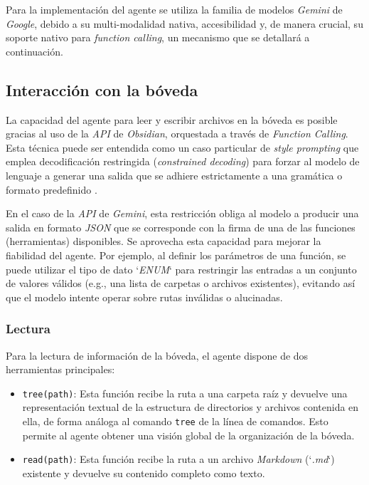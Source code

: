 Para la implementación del agente se utiliza la familia de modelos \textit{Gemini} de \textit{Google}, debido a su multi-modalidad nativa, accesibilidad y, de manera crucial, su soporte nativo para \textit{function calling}, un mecanismo que se detallará a continuación.

\subsection{Interacción con la bóveda}
La capacidad del agente para leer y escribir archivos en la bóveda es posible gracias al uso de la \textit{API} de \textit{Obsidian}, orquestada a través de \textit{Function Calling}. Esta técnica puede ser entendida como un caso particular de \textit{style prompting} que emplea decodificación restringida (\textit{constrained decoding}) para forzar al modelo de lenguaje a generar una salida que se adhiere estrictamente a una gramática o formato predefinido \parencite{gengGrammarConstrainedDecodingStructured2024}.

\newpage

En el caso de la \textit{API} de \textit{Gemini}, esta restricción obliga al modelo a producir una salida en formato \textit{JSON} que se corresponde con la firma de una de las funciones (herramientas) disponibles. Se aprovecha esta capacidad para mejorar la fiabilidad del agente. Por ejemplo, al definir los parámetros de una función, se puede utilizar el tipo de dato `\textit{ENUM}` para restringir las entradas a un conjunto de valores válidos (e.g., una lista de carpetas o archivos existentes), evitando así que el modelo intente operar sobre rutas inválidas o alucinadas.

\subsubsection{Lectura}
Para la lectura de información de la bóveda, el agente dispone de dos herramientas principales:
\begin{itemize}
    \item \texttt{tree(path)}: Esta función recibe la ruta a una carpeta raíz y devuelve una representación textual de la estructura de directorios y archivos contenida en ella, de forma análoga al comando \texttt{tree} de la línea de comandos. Esto permite al agente obtener una visión global de la organización de la bóveda.
    \item \texttt{read(path)}: Esta función recibe la ruta a un archivo \textit{Markdown} (`\textit{.md}`) existente y devuelve su contenido completo como texto.
\end{itemize}
 
